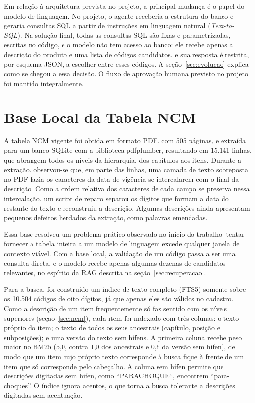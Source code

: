 Em relação à arquitetura prevista no projeto, a principal mudança é o papel do modelo de linguagem. No projeto, o agente receberia a estrutura do banco e geraria consultas SQL a partir de instruções em linguagem natural (\textit{Text-to-SQL}). Na solução final, todas as consultas SQL são fixas e parametrizadas, escritas no código, e o modelo não tem acesso ao banco: ele recebe apenas a descrição do produto e uma lista de códigos candidatos, e sua resposta é restrita, por esquema JSON, a escolher entre esses códigos. A seção~\ref{sec:evolucao} explica como se chegou a essa decisão. O fluxo de aprovação humana previsto no projeto foi mantido integralmente.

\section{Base Local da Tabela NCM}

A tabela NCM vigente foi obtida em formato PDF, com 505 páginas, e extraída para um banco SQLite com a biblioteca pdfplumber, resultando em 15.141 linhas, que abrangem todos os níveis da hierarquia, dos capítulos aos itens. Durante a extração, observou-se que, em parte das linhas, uma camada de texto sobreposta no PDF fazia os caracteres da data de vigência se intercalarem com o final da descrição. Como a ordem relativa dos caracteres de cada campo se preserva nessa intercalação, um script de reparo separou os dígitos que formam a data do restante do texto e reconstruiu a descrição. Algumas descrições ainda apresentam pequenos defeitos herdados da extração, como palavras emendadas.

Essa base resolveu um problema prático observado no início do trabalho: tentar fornecer a tabela inteira a um modelo de linguagem excede qualquer janela de contexto viável. Com a base local, a validação de um código passa a ser uma consulta direta, e o modelo recebe apenas algumas dezenas de candidatos relevantes, no espírito da RAG descrita na seção~\ref{sec:recuperacao}.

Para a busca, foi construído um índice de texto completo (FTS5) somente sobre os 10.504 códigos de oito dígitos, já que apenas eles são válidos no cadastro. Como a descrição de um item frequentemente só faz sentido com os níveis superiores (seção~\ref{sec:ncm}), cada item foi indexado com três colunas: o texto próprio do item; o texto de todos os seus ancestrais (capítulo, posição e subposições); e uma versão do texto sem hífens. A primeira coluna recebe peso maior no BM25 (5,0, contra 1,0 dos ancestrais e 0,5 da versão sem hífen), de modo que um item cujo próprio texto corresponde à busca fique à frente de um item que só corresponde pelo cabeçalho. A coluna sem hífen permite que descrições digitadas sem hífen, como ``PARACHOQUE'', encontrem ``para-choques''. O índice ignora acentos, o que torna a busca tolerante a descrições digitadas sem acentuação.

